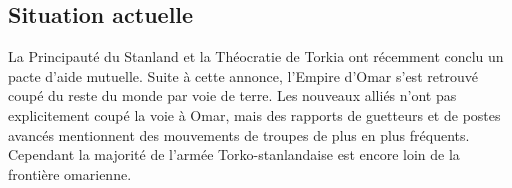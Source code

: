 \documentclass[french, a4paper, 12pt]{article}
\begin{document}
\subsection{Situation actuelle}

La Principauté du Stanland et la Théocratie de Torkia ont récemment conclu un pacte d'aide mutuelle. Suite à cette annonce, l'Empire d'Omar s'est retrouvé coupé du reste du monde par voie de terre. Les nouveaux alliés n'ont pas explicitement coupé la voie à Omar, mais des rapports de guetteurs et de postes avancés mentionnent des mouvements de troupes de plus en plus fréquents. Cependant la majorité de l'armée Torko-stanlandaise est encore loin de la frontière omarienne.
\end{document}
